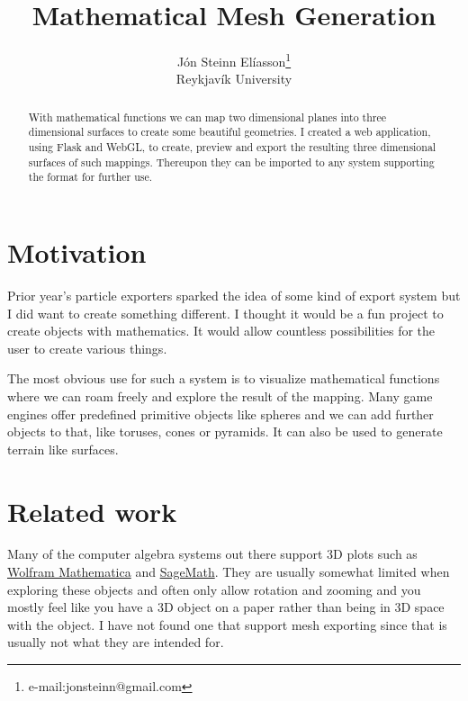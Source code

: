 \documentclass{acmsiggraph}
\title{Mathematical Mesh Generation}
\author{J\'{o}n Steinn El\'{i}asson\thanks{e-mail:jonsteinn@gmail.com}\\Reykjav\'{i}k University}
\begin{document}

\maketitle

\begin{abstract}

With mathematical functions we can map two dimensional planes into three dimensional surfaces to create some beautiful geometries. I created a web application, using Flask and WebGL, to create, preview and export the resulting three dimensional surfaces of such mappings. Thereupon they can be imported to any system supporting the format for further use.

\end{abstract}

\keywordlist

\section{Motivation}
Prior year's particle exporters sparked the idea of some kind of export system but I did want to create something different. I thought it would be a fun project to create objects with mathematics. It would allow countless possibilities for the user to create various things.

The most obvious use for such a system is to visualize mathematical functions where we can roam freely and explore the result of the mapping. Many game engines offer predefined primitive objects like spheres and we can add further objects to that, like toruses, cones or pyramids. It can also be used to generate terrain like surfaces.

\section{Related work}
Many of the computer algebra systems out there support 3D plots such as \href{https://www.wolfram.com/mathematica/}{Wolfram Mathematica} and \href{http://www.sagemath.org/}{SageMath}. They are usually somewhat limited when exploring these objects and often only allow rotation and zooming and you mostly feel like you have a 3D object on a paper rather than being in 3D space with the object. I have not found one that support mesh exporting since that is usually not what they are intended for.
\end{document}
